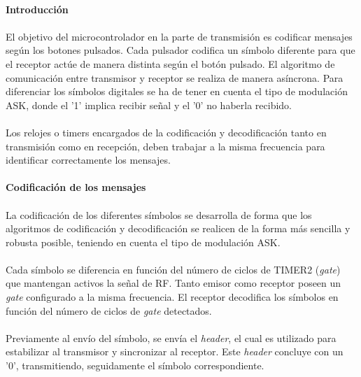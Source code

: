 \paragraph{Introducción} 
\paragraph{}
El objetivo del microcontrolador en la parte de transmisión es codificar mensajes según los botones pulsados.
Cada pulsador codifica un símbolo diferente para que el receptor actúe de manera distinta según el botón pulsado. El algoritmo de comunicación entre transmisor y receptor se realiza de manera asíncrona. Para diferenciar los símbolos digitales se ha de tener en cuenta el tipo de modulación ASK, donde el '1' implica recibir señal y el '0' no haberla recibido. 
\paragraph{}
Los relojes o timers encargados de la codificación y decodificación tanto en transmisión como en recepción, deben trabajar a la misma frecuencia para identificar correctamente los mensajes.

\paragraph{}
\paragraph{Codificaci\'on de los mensajes} 
\paragraph{}
La codificación de los diferentes símbolos se desarrolla de forma que los algoritmos de codificación y decodificación se realicen de la forma más sencilla y robusta posible, teniendo en cuenta el tipo de modulación ASK.
\paragraph{}
Cada s\'imbolo se diferencia en funci\'on del n\'umero de ciclos de TIMER2 (\textit{gate}) que mantengan activos la señal de RF.
Tanto emisor como receptor poseen un \textit{gate} configurado a la misma frecuencia. El receptor decodifica los s\'imbolos en función del número de ciclos de \textit{gate} detectados. 
\paragraph{}
Previamente al envío del símbolo, se envía el \textit{header}, el cual es utilizado para estabilizar al transmisor y sincronizar al receptor. Este \textit{header} concluye con un '0', transmitiendo, seguidamente el s\'imbolo correspondiente.
